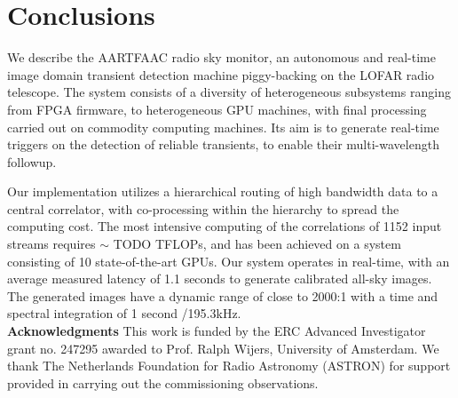 \documentclass{ws-jai}
\begin{document}

\section {\label{sec:conclusion} Conclusions}
We describe  the AARTFAAC radio sky  monitor, an autonomous and  real-time image
domain   transient  detection   machine   piggy-backing  on   the  LOFAR   radio
telescope.  The  system consists  of  a  diversity of  heterogeneous  subsystems
ranging from FPGA firmware, to heterogeneous GPU machines, with final processing
carried out on  commodity computing machines.  Its aim is  to generate real-time
triggers   on  the   detection   of  reliable   transients,   to  enable   their
multi-wavelength followup.

Our implementation utilizes  a hierarchical routing of high bandwidth  data to a
central  correlator,  with co-processing  within  the  hierarchy to  spread  the
computing cost.  The most intensive computing  of the correlations of 1152 input
streams  requires  $\sim$  TODO  TFLOPs,  and has  been  achieved  on  a  system
consisting of 10 state-of-the-art GPUs.   Our system operates in real-time, with
an  average measured  latency  of  1.1 seconds  to  generate calibrated  all-sky
images. The generated images have a dynamic range of close to 2000:1 with a time
and spectral integration of 1 second /195.3kHz.\\


\noindent  \textbf{Acknowledgments} This  work  is funded  by  the ERC  Advanced
Investigator  grant no.  247295 awarded  to Prof.   Ralph Wijers,  University of
Amsterdam.  We thank The Netherlands Foundation for Radio Astronomy (ASTRON) for
support provided in carrying out the commissioning observations.



\end{document}
